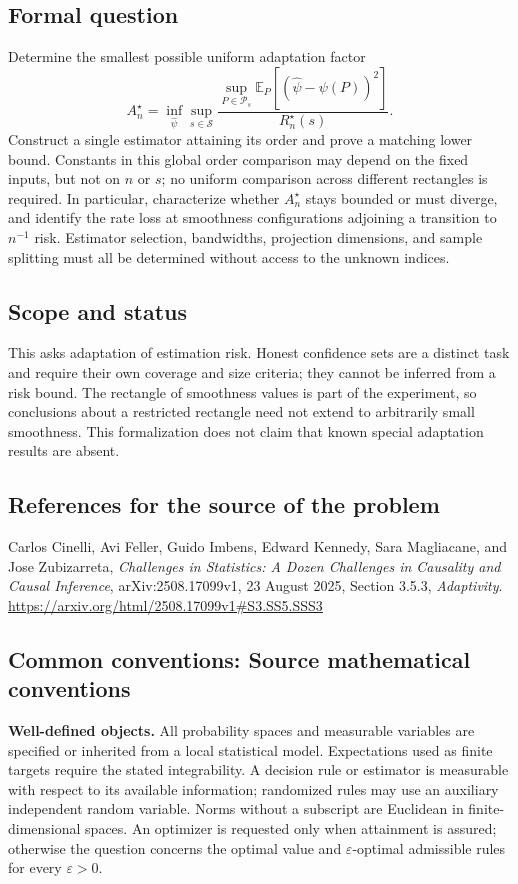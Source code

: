 \documentclass[11pt,a4paper]{article}
\newcommand{\E}{\mathbb E}
\begin{document}
\subsection*{Formal question}
Determine the smallest possible uniform adaptation factor
\[
 A_n^\star=
 \inf_{\widehat\psi}
 \sup_{s\in\mathcal S}
 \frac{\sup_{P\in\mathcal P_s}
 \E_P[(\widehat\psi-\psi(P))^2]}{R_n^\star(s)}.
\]
Construct a single estimator attaining its order and prove a matching lower bound. Constants in this global order comparison may depend on the fixed inputs, but not on $n$ or $s$; no uniform comparison across different rectangles is required. In particular, characterize whether $A_n^\star$ stays bounded or must diverge, and identify the rate loss at smoothness configurations adjoining a transition to $n^{-1}$ risk. Estimator selection, bandwidths, projection dimensions, and sample splitting must all be determined without access to the unknown indices.
\subsection*{Scope and status}
This asks adaptation of estimation risk. Honest confidence sets are a distinct task and require their own coverage and size criteria; they cannot be inferred from a risk bound. The rectangle of smoothness values is part of the experiment, so conclusions about a restricted rectangle need not extend to arbitrarily small smoothness. This formalization does not claim that known special adaptation results are absent.
\subsection*{References for the source of the problem}
Carlos Cinelli, Avi Feller, Guido Imbens, Edward Kennedy, Sara Magliacane, and Jose Zubizarreta, \emph{Challenges in Statistics: A Dozen Challenges in Causality and Causal Inference}, arXiv:2508.17099v1, 23 August 2025, Section 3.5.3, \emph{Adaptivity}.
\url{https://arxiv.org/html/2508.17099v1#S3.SS5.SSS3}

\subsection*{Common conventions: Source mathematical conventions}

\textbf{Well-defined objects.}
All probability spaces and measurable variables are specified or inherited
from a local statistical model. Expectations used as finite targets require
the stated integrability. A decision rule or estimator is measurable with
respect to its available information; randomized rules may use an auxiliary
independent random variable. Norms without a subscript are Euclidean in
finite-dimensional spaces. An optimizer is requested only when attainment
is assured; otherwise the question concerns the optimal value and
$\varepsilon$-optimal admissible rules for every $\varepsilon>0$.
\end{document}
